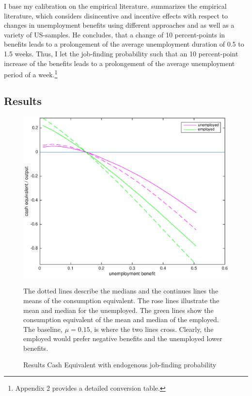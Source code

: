 \documentclass[a4paper,12pt]{article}
\begin{document}
I base my calibration on the empirical literature. \citep{decker} summarizes the empirical literature, which considers disincentive and incentive effects with respect to changes in unemployment benefits using different approaches and as well as a variety of US-samples. He concludes, that a change of 10 percent-points in benefits leads to a prolongement of the average unemployment duration of 0.5 to 1.5 weeks. 
Thus, I let the job-finding probability such that an 10 percent-point increase of the benefits leads to a prolongement of the average unemployment period of a week.\footnote{Appendix 2 provides a detailed conversion table.}

\subsection{Results}
\begin{figure}
\caption{Results Cash Equivalent with endogenous job-finding probability} 
\label{baseline_ue_vs_e}	%
\centering
\includegraphics[scale=.7]{cash_equivalent(ue_vs_e)}  %

\begin{minipage}{0.8\linewidth}
\footnotesize{The dotted lines describe the medians and the continues lines the means of the consumption equivalent. The rose lines illustrate the mean and median for the unemployed. The green lines show the consumption equivalent of the mean and median of the employed. The baseline, $\mu = 0.15$, is where the two lines cross. Clearly, the employed would prefer negative benefits and the unemployed lower benefits. }
\end{minipage}

\end{figure}
\end{document}
